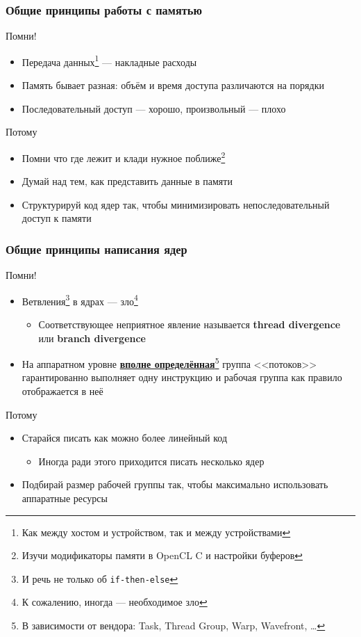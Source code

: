 \documentclass[xcolor=table,aspectratio=169]{beamer}
\begin{document}
\begin{frame}[fragile]
  \frametitle{Общие принципы работы с памятью}
  Помни!
  \begin{itemize}
    \item Передача данных\footnote{Как между хостом и устройством, так и между устройствами} --- накладные расходы
    \item Память бывает разная: объём и время доступа различаются на порядки
    \item Последовательный доступ --- хорошо, произвольный --- плохо
  \end{itemize}
  Потому
  \begin{itemize}
    \item Помни что где лежит и клади нужное поближе\footnote{Изучи модификаторы памяти в OpenCL C и настройки буферов}
    \item Думай над тем, как представить данные в памяти
    \item Структурируй код ядер так, чтобы минимизировать непоследовательный доступ к памяти
  \end{itemize}
\end{frame}

\begin{frame}[fragile]
  \frametitle{Общие принципы написания ядер}
  Помни!
  \begin{itemize}
    \item Ветвления\footnote{И речь не только об \texttt{if-then-else}} в ядрах --- зло\footnote{К сожалению, иногда --- необходимое зло} 
    \begin{itemize}
      \item Соответствующее неприятное явление называется \textbf{thread divergence} или \textbf{branch divergence}
    \end{itemize}
    \item На аппаратном уровне \underline{\textbf{вполне определённая}}\footnote{В зависимости от вендора: Task, Thread Group, Warp, Wavefront, \ldots} группа <<потоков>> гарантированно выполняет одну инструкцию и рабочая группа как правило отображается в неё
  \end{itemize}
  Потому
  \begin{itemize}
    \item Старайся писать как можно более линейный код
    \begin{itemize}
      \item Иногда ради этого приходится писать несколько ядер
    \end{itemize}
    \item Подбирай размер рабочей группы так, чтобы максимально использовать аппаратные ресурсы
  \end{itemize}
\end{frame}
\end{document}
